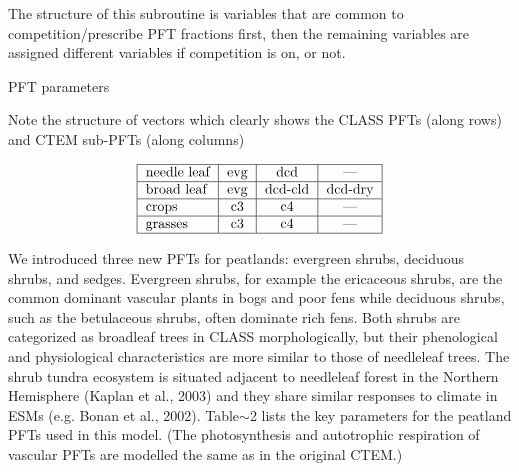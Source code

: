 The structure of this subroutine is variables that are common to competition/prescribe P\+F\+T fractions first, then the remaining variables are assigned different variables if competition is on, or not.

P\+F\+T parameters

Note the structure of vectors which clearly shows the C\+L\+A\+S\+S P\+F\+Ts (along rows) and C\+T\+E\+M sub-\/\+P\+F\+Ts (along columns)

\[ \begin{tabular} { | l | c | c | c | } \hline needle leaf & evg & dcd & --- \\ \hline broad leaf & evg & dcd-cld & dcd-dry \\ \hline crops & c3 & c4 & --- \\ \hline grasses & c3 & c4 & --- \\ \hline \end{tabular} \]

We introduced three new P\+F\+Ts for peatlands\+: evergreen shrubs, deciduous shrubs, and sedges. Evergreen shrubs, for example the ericaceous shrubs, are the common dominant vascular plants in bogs and poor fens while deciduous shrubs, such as the betulaceous shrubs, often dominate rich fens. Both shrubs are categorized as broadleaf trees in C\+L\+A\+S\+S morphologically, but their phenological and physiological characteristics are more similar to those of needleleaf trees. The shrub tundra ecosystem is situated adjacent to needleleaf forest in the Northern Hemisphere (Kaplan et al., 2003) and they share similar responses to climate in E\+S\+Ms (e.\+g. Bonan et al., 2002). Table$\sim$2 lists the key parameters for the peatland P\+F\+Ts used in this model. (The photosynthesis and autotrophic respiration of vascular P\+F\+Ts are modelled the same as in the original C\+T\+E\+M.) 